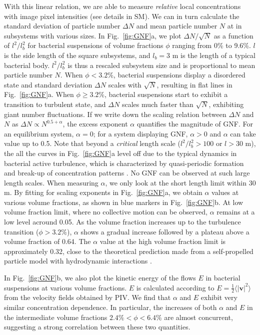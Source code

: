 \documentclass[twocolumn,aps,prl,amsmath,amssymb,longbibliography]{revtex4-2}
\begin{document}
With this linear relation, we are able to measure \emph{relative} local concentrations with image pixel intensities (see details in SM). We can in turn calculate the standard deviation of particle number $\Delta N$ and mean particle number $N$ at in subsystems with various sizes. In Fig.~\ref{fig:GNF}a, we plot $\Delta N / \sqrt N$ as a function of $l^2/l_b^2$ for bacterial suspensions of volume fractions $\phi$ ranging from 0\% to 9.6\%.
$l$ is the side length of the square subsystems, and $l_b=3$ \textmu m is the length of a typical bacterial body. $l^2/l_b^2$ is thus a rescaled subsystem size and is proportional to mean particle number $N$.
When $\phi<3.2\%$, bacterial suspensions display a disordered state and standard deviation $\Delta N$ scales with $\sqrt N$, resulting in flat lines in Fig.~\ref{fig:GNF}a.
When $\phi\ge3.2\%$, bacterial suspensions start to exhibit a transition to turbulent state, and $\Delta N$ scales much faster than $\sqrt N$, exhibiting giant number fluctuations.
If we write down the scaling relation between $\Delta N$ and $N$ as $\Delta N \propto N^{0.5+\alpha}$, the excess exponent $\alpha$ quantifies the magnitude of GNF.
For an equilibrium system, $\alpha=0$; for a system displaying GNF, $\alpha>0$ and $\alpha$ can take value up to 0.5.
Note that beyond a \emph{critical} length scale ($l^2/l_b^2>100$ or $l>30$ \textmu m), the all the curves in Fig.~\ref{fig:GNF}a level off due to the typical dynamics in bacterial active turbulence, which is characterized by quasi-periodic formation and break-up of concentration patterns \cite{Saintillan2012}. No GNF can be observed at such large length scales. When measuring $\alpha$, we only look at the short length limit within 30 \textmu m.
By fitting for scaling exponents in Fig.~\ref{fig:GNF}a, we obtain $\alpha$ values at various volume fractions, as shown in blue markers in Fig.~\ref{fig:GNF}b.
At low volume fraction limit, where no collective motion can be observed, $\alpha$ remains at a low level acround 0.05.
As the volume fraction increases up to the turbulence transition ($\phi>3.2\%$), $\alpha$ shows a gradual increase followed by a plateau above a volume fraction of 0.64.
The $\alpha$ value at the high volume fraction limit is approximately 0.32, close to the theoretical prediction made from a self-propelled particle model with hydrodynamic interactions \cite{AditiSimha2002}.

In Fig.~\ref{fig:GNF}b, we also plot the kinetic energy of the flows $E$ in bacterial suspensions at various volume fractions.
$E$ is calculated according to $E = \frac{1}{2}\langle|\boldsymbol{v}|^2 \rangle$ from the velocity fields obtained by PIV.
We find that $\alpha$ and $E$ exhibit very similar concentration dependence. In particular, the increases of both $\alpha$ and $E$ in the intermediate volume fractions $2.4\%<\phi<6.4\%$ are almost concurrent, suggesting a strong correlation between these two quantities.
\end{document}
